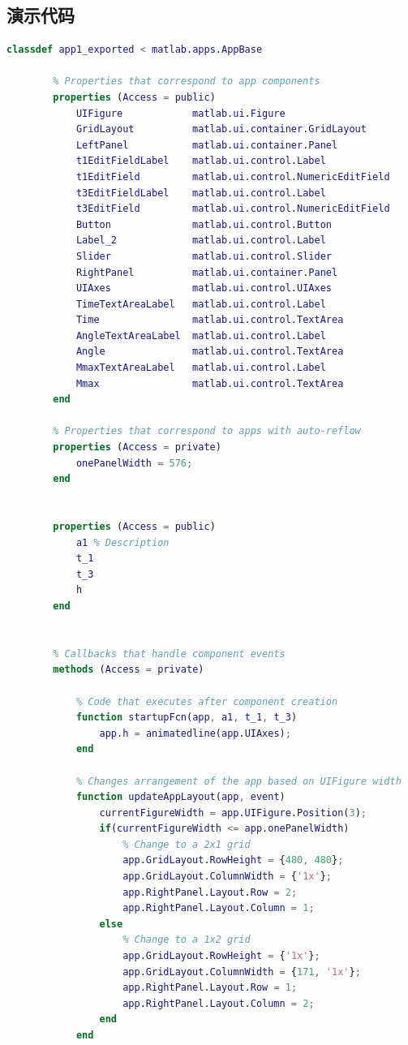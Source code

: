 \documentclass[withoutpreface,bwprint]{cumcmthesis} %
\begin{document}
\begin{appendices}
     \section{演示代码}
     \begin{lstlisting}[language=matlab]
        classdef app1_exported < matlab.apps.AppBase

        % Properties that correspond to app components
        properties (Access = public)
            UIFigure            matlab.ui.Figure
            GridLayout          matlab.ui.container.GridLayout
            LeftPanel           matlab.ui.container.Panel
            t1EditFieldLabel    matlab.ui.control.Label
            t1EditField         matlab.ui.control.NumericEditField
            t3EditFieldLabel    matlab.ui.control.Label
            t3EditField         matlab.ui.control.NumericEditField
            Button              matlab.ui.control.Button
            Label_2             matlab.ui.control.Label
            Slider              matlab.ui.control.Slider
            RightPanel          matlab.ui.container.Panel
            UIAxes              matlab.ui.control.UIAxes
            TimeTextAreaLabel   matlab.ui.control.Label
            Time                matlab.ui.control.TextArea
            AngleTextAreaLabel  matlab.ui.control.Label
            Angle               matlab.ui.control.TextArea
            MmaxTextAreaLabel   matlab.ui.control.Label
            Mmax                matlab.ui.control.TextArea
        end
    
        % Properties that correspond to apps with auto-reflow
        properties (Access = private)
            onePanelWidth = 576;
        end
    
        
        properties (Access = public)
            a1 % Description
            t_1
            t_3
            h
        end
        
    
        % Callbacks that handle component events
        methods (Access = private)
    
            % Code that executes after component creation
            function startupFcn(app, a1, t_1, t_3)
                app.h = animatedline(app.UIAxes);
            end
    
            % Changes arrangement of the app based on UIFigure width
            function updateAppLayout(app, event)
                currentFigureWidth = app.UIFigure.Position(3);
                if(currentFigureWidth <= app.onePanelWidth)
                    % Change to a 2x1 grid
                    app.GridLayout.RowHeight = {480, 480};
                    app.GridLayout.ColumnWidth = {'1x'};
                    app.RightPanel.Layout.Row = 2;
                    app.RightPanel.Layout.Column = 1;
                else
                    % Change to a 1x2 grid
                    app.GridLayout.RowHeight = {'1x'};
                    app.GridLayout.ColumnWidth = {171, '1x'};
                    app.RightPanel.Layout.Row = 1;
                    app.RightPanel.Layout.Column = 2;
                end
            end
    

\end{lstlisting}
\end{appendices}
\end{document}

